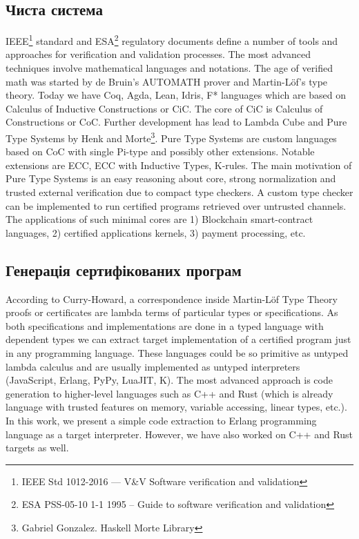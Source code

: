 \begin{definition}
\begin{definition}
\begin{definition}
\begin{definition}
\newpage
\section{Чиста система}

IEEE\footnote{IEEE Std 1012-2016  --- V\&V Software verification and validation} standard
and ESA\footnote{ESA PSS-05-10 1-1 1995 -- Guide to software verification and validation} regulatory documents define a number of tools and approaches for verification and validation processes. 
The most advanced techniques involve mathematical languages and notations. 
The age of verified math was started by de Bruin's AUTOMATH prover and Martin-Löf\cite{Lof84}'s type theory. 
Today we have Coq, Agda, Lean, Idris, F* languages which are based on Calculus of Inductive Constructions or CiC\cite{Mohring15}.
The core of CiC is Calculus of Constructions or CoC\cite{Coq88}.
Further development has lead to Lambda Cube\cite{Henk93} and Pure Type Systems by Henk\cite{Erik97} and Morte\footnote{Gabriel Gonzalez. Haskell Morte Library}.
Pure Type Systems are custom languages based on CoC with single Pi-type and possibly other extensions.
Notable extensions are ECC, ECC with Inductive Types\cite{Ore92}, K-rules\cite{Barthe95}.
The main motivation of Pure Type Systems is an easy reasoning about core, strong normalization and trusted external verification due to compact type checkers.
A custom type checker can be implemented to run certified programs retrieved over untrusted channels.
The applications of such minimal cores are 1) Blockchain smart-contract languages, 2) certified applications kernels, 3) payment processing, etc.

\subsection{Генерація сертифікованих програм}
According to Curry-Howard, a correspondence inside Martin-Löf Type Theory\cite{Lof84} proofs or certificates are lambda terms of particular types or specifications.
As both specifications and implementations are done in a typed language with dependent types we can extract target implementation of a certified program just in any programming language.
These languages could be so primitive as untyped lambda calculus and are usually implemented as untyped interpreters (JavaScript, Erlang, PyPy, LuaJIT, K).
The most advanced approach is code generation to higher-level languages such as C++ and Rust (which is already language with trusted features on memory, variable accessing, linear types, etc.).
In this work, we present a simple code extraction to Erlang programming language as a target interpreter.
However, we have also worked on C++ and Rust targets as well.


\end{definition}
\end{definition}
\end{definition}
\end{definition}
